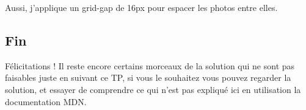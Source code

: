 Aussi, j'applique un grid-gap de 16px pour espacer les photos entre elles.


\subsection{Fin}
Félicitations ! Il reste encore certains morceaux de la solution qui ne sont pas
faisables juste en suivant ce TP, si vous le souhaitez vous pouvez regarder la
solution, et essayer de comprendre ce qui n'est pas expliqué ici en utilisation
la documentation MDN.
